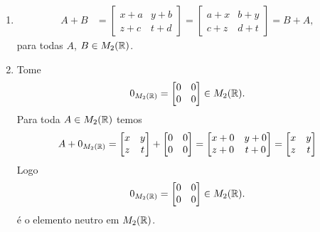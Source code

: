 \documentclass[12pt]{exam}
\begin{document}
\begin{enumerate}[label={\roman*})]
    \item 
    \begin{align*}
        A + B &= 
        \begin{bmatrix}
            x + a & y + b\\z + c & t + d 
        \end{bmatrix} = \begin{bmatrix}
            a + x & b + y\\c + z & d + t
        \end{bmatrix} = B + A,
    \end{align*}
    para todas $A$, $B \in M_2(\mathbb{R})$.

    \item Tome
    \[
        0_{M_2(\mathbb{R})} = \begin{bmatrix}
            0 & 0\\0 & 0
        \end{bmatrix} \in M_2(\mathbb{R}).
    \]
    Para toda $A \in M_2(\mathbb{R})$ temos
    \begin{align*}
        A + 0_{M_2(\mathbb{R})} = \begin{bmatrix}
        x & y\\
        z & t
    \end{bmatrix} + \begin{bmatrix}
        0 & 0\\
        0 & 0
    \end{bmatrix} = \begin{bmatrix}
        x + 0& y + 0\\
        z + 0& t + 0
    \end{bmatrix} = \begin{bmatrix}
        x & y\\
        z & t
    \end{bmatrix}
    \end{align*}
    Logo
    \[
        0_{M_2(\mathbb{R})} = \begin{bmatrix}
            0 & 0\\0 & 0
        \end{bmatrix} \in M_2(\mathbb{R}).
    \]
    \'e o elemento neutro em $M_2(\mathbb{R})$.


\end{enumerate}
\end{document}
